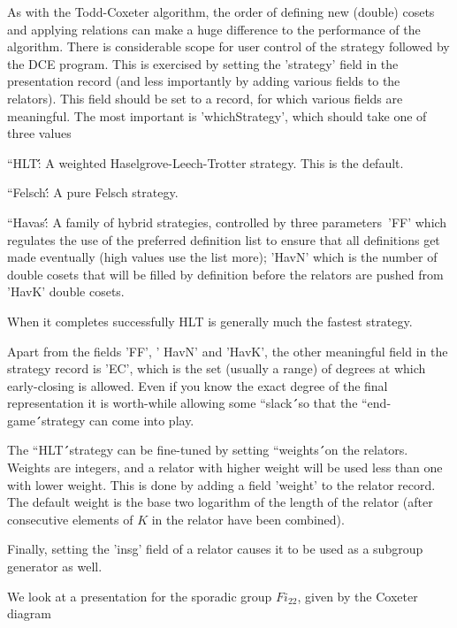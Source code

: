 As with the Todd-Coxeter algorithm,   the order of defining new  (double)
cosets    and applying relations    can  make a huge   difference  to the
performance  of  the algorithm.   There  is considerable scope  for  user
control of the strategy followed by the DCE program. This is exercised by
setting  the   'strategy' field in   the   presentation record (and  less
importantly by adding various fields  to the relators). This field should
be  set to a record, for  which various  fields  are meaningful. The most
important is 'whichStrategy', which should take one of three values\:

``HLT\'\':  A   weighted Haselgrove-Leech-Trotter strategy.  This  is the
default.

``Felsch\'\': A pure Felsch strategy.

``Havas\'\': A  family    of  hybrid strategies,   controlled    by three
parameters\:\ 'FF' which regulates the  use  of the preferred  definition
list to ensure that all definitions get made  eventually (high values use
the list more); 'HavN' which is the number of double  cosets that will be
filled  by definition before  the relators are  pushed from 'HavK' double
cosets.

When it  completes  successfully  HLT  is   generally much  the   fastest
strategy.

Apart from  the fields  'FF', ' HavN'  and 'HavK',  the  other meaningful
field in the strategy record is 'EC', which  is the set (usually a range)
of degrees at which early-closing is allowed.  Even if you know the exact
degree  of  the final representation   it  is  worth-while allowing  some
``slack\'\'\ so that the ``end-game\'\'\ strategy can come into play.

The ``HLT\'\'\ strategy can  be  fine-tuned by setting ``weights\'\'\  on
the relators. Weights are integers, and a relator with higher weight will
be used less than one  with lower weight. This  is done by adding a field
'weight' to the relator record.    The default weight   is the base   two
logarithm of the length of the relator (after consecutive elements of $K$
in the relator have been combined).

Finally, setting the 'insg' field of a relator causes it to  be used as a
subgroup generator as well.


We look at a presentation for the sporadic  group $Fi_{22}$, given by the
Coxeter diagram\:

